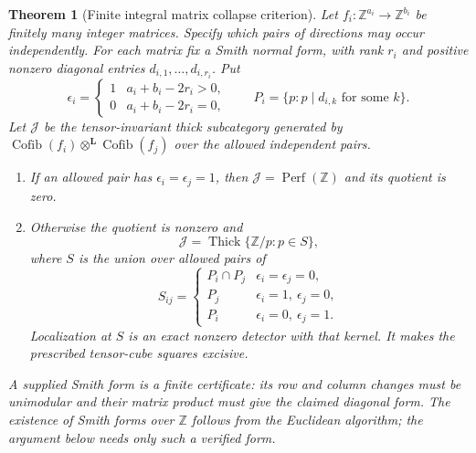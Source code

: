 \documentclass[11pt]{article}
\newtheorem{theorem}{Theorem}[section]
\theoremstyle{definition}
\theoremstyle{remark}
\newcommand{\Cofib}{\operatorname{Cofib}}
\begin{document}
\begin{theorem}[Finite integral matrix collapse criterion]\label{thm:matrix-collapse}
Let $f_i:\mathbb Z^{a_i}\to\mathbb Z^{b_i}$ be finitely many integer matrices. Specify which pairs of directions may occur independently. For each matrix fix a Smith normal form, with rank $r_i$ and positive nonzero diagonal entries $d_{i,1},\ldots,d_{i,r_i}$. Put
\[
 \epsilon_i=\begin{cases}
 1&a_i+b_i-2r_i>0,\\
 0&a_i+b_i-2r_i=0,
 \end{cases}
 \qquad
 P_i=\{p:p\mid d_{i,k}\text{ for some }k\}.
\]
Let $\mathcal J$ be the tensor-invariant thick subcategory generated by $\Cofib(f_i)\otimes^{\mathbf L}\Cofib(f_j)$ over the allowed independent pairs.
\begin{enumerate}
\item If an allowed pair has $\epsilon_i=\epsilon_j=1$, then $\mathcal J=\operatorname{Perf}(\mathbb Z)$ and its quotient is zero.
\item Otherwise the quotient is nonzero and
\[
 \mathcal J=\operatorname{Thick}\{\mathbb Z/p:p\in S\},
\]
where $S$ is the union over allowed pairs of
\[
 S_{ij}=\begin{cases}
 P_i\cap P_j&\epsilon_i=\epsilon_j=0,\\
 P_j&\epsilon_i=1,\ \epsilon_j=0,\\
 P_i&\epsilon_i=0,\ \epsilon_j=1.
 \end{cases}
\]
Localization at $S$ is an exact nonzero detector with that kernel. It makes the prescribed tensor-cube squares excisive.
\end{enumerate}
A supplied Smith form is a finite certificate: its row and column changes must be unimodular and their matrix product must give the claimed diagonal form. The existence of Smith forms over $\mathbb Z$ follows from the Euclidean algorithm; the argument below needs only such a verified form.
\end{theorem}
\end{document}
